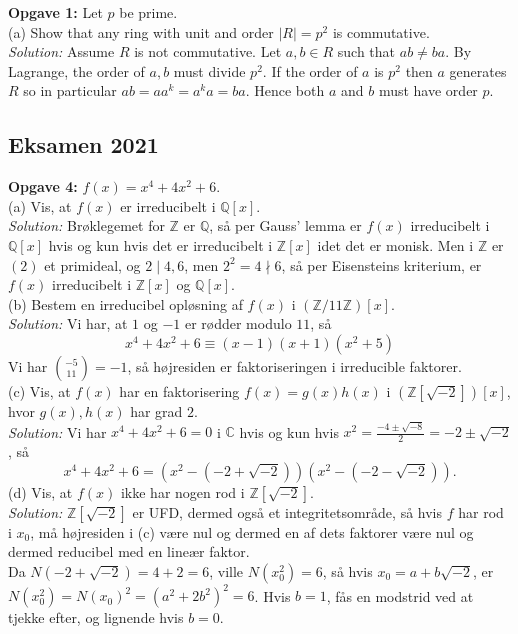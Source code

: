 \documentclass[a4paper]{article}
\begin{document}
    
\textbf{Opgave 1:} Let $p$ be prime.\\
(a) Show that any ring with unit and order $|R| = p^2$ is commutative.\\
\linebreak
\textit{Solution:} Assume $R$ is not commutative. Let $a,b \in R$ such that
$ab \neq ba$. By Lagrange, the order of $a,b$ must divide $p^2$. If 
the order of $a$ is $p^2$ then $a $ generates $R$ so in particular
$ab = a a^{k} = a^{k} a = ba$. Hence both $a$ and $b$ must have order $p$.




\subsection{Eksamen 2021}

\textbf{Opgave 4:} $f(x) = x^{4} + 4x^2 + 6.$ \\
(a) Vis, at $f(x)$ er irreducibelt i $\mathbb{Q} [x]$.\\
\textit{Solution:} Brøklegemet for $\mathbb{Z}$ er $\mathbb{Q}$, så per Gauss' 
lemma er $f(x)$ irreducibelt i $\mathbb{Q}[x]$ hvis og kun hvis det er
irreducibelt i $\mathbb{Z}[x]$ idet det er monisk. Men i $\mathbb{Z}$ er $(2)$
et primideal, og $2  \mid 4,6$, men $2^2 = 4 \nmid 6$, så per Eisensteins
kriterium, er $f(x)$ irreducibelt i $\mathbb{Z}[x]$ og $\mathbb{Q}[x]$.\\
\linebreak
(b) Bestem en irreducibel opløsning af $f(x)$ i $\left( \mathbb{Z}/11\mathbb{Z}
\right) [x]$.\\
\linebreak
\textit{Solution:} Vi har, at $1$ og $-1$ er rødder modulo $11$, så
\[
    x^{4} + 4x^2 + 6 \equiv (x-1)(x+1)(x^2 +5)
\] 
Vi har $\binom{-5}{11} = -1$, så højresiden er faktoriseringen i irreducible
faktorer.\\
\linebreak
(c) Vis, at $f(x)$ har en faktorisering $f(x) = g(x) h(x)$ i
$\left( \mathbb{Z}\left[ \sqrt{-2}  \right]  \right) [x]$, hvor $g(x),h(x)$ har
grad $2$.\\
\linebreak
\textit{Solution:} Vi har $x^{4} + 4x^2 + 6 = 0$ i $\mathbb{C}$ hvis og kun
hvis
$x^2 = \frac{-4 \pm \sqrt{-8} }{2} = -2 \pm \sqrt{-2} $, så
\[
x^4 + 4x^2 + 6 = \left( x^2 - \left( -2 + \sqrt{-2}  \right)  \right) 
\left( x^2 - \left( -2 - \sqrt{-2}  \right)  \right).
\] 
(d) Vis, at $f(x)$ ikke har nogen rod i $\mathbb{Z}\left[ \sqrt{-2}  \right]
$.\\
\linebreak
\textit{Solution:} $\mathbb{Z}\left[ \sqrt{-2}  \right] $ er UFD, dermed også
et integritetsområde, så hvis $f$ har rod i $x_0$, må højresiden i (c) være
nul og dermed en af dets faktorer være nul og dermed reducibel med en lineær
faktor.\\
Da $N \left( -2 + \sqrt{-2}  \right) = 4 +2 = 6$, ville
$N(x_0^2) = 6$, så hvis $x_0 = a+ b\sqrt{-2} $, er
$N(x_0^2) = N(x_0)^2 = (a^2 + 2 b^2)^2 = 6$. Hvis $b=1$, fås en modstrid ved at
tjekke efter, og lignende hvis $b=0$.
\end{document}
